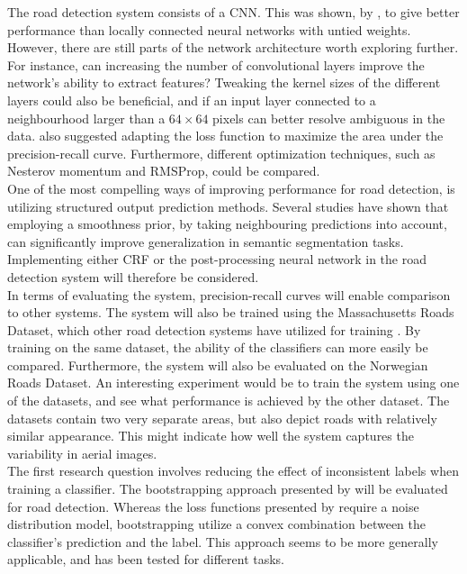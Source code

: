 The road detection system consists of a \ac{CNN}. This was shown, by \cite{MnihThesis}, to give better performance than locally connected neural networks with untied weights. However, there are still parts of the network architecture worth exploring further. For instance, can increasing the number of convolutional layers improve the network's ability to extract features? Tweaking the kernel sizes of the different layers could also be beneficial, and if an input layer connected to a neighbourhood larger than a $64 \times 64$ pixels can better resolve ambiguous in the data. \cite{MnihThesis} also suggested adapting the loss function to maximize the area under the precision-recall curve. Furthermore, different optimization techniques, such as Nesterov momentum and RMSProp, could be compared.\\

One of the most compelling ways of improving performance for road detection, is utilizing structured output prediction methods. Several studies \citep{Kluckner_semantic_height} \citep{LeCun_semantic} \citep{Mnih_roads_high_res_aerial_images} have shown that employing a smoothness prior, by taking neighbouring predictions into account, can significantly improve generalization in semantic segmentation tasks. Implementing either \ac{CRF} or the post-processing neural network in the road detection system will therefore be considered.\\

In terms of evaluating the system, precision-recall curves will enable comparison to other systems. The system will also be trained using the Massachusetts Roads Dataset, which other road detection systems have utilized for training \citep{MnihThesis}\citep{saito_building_and_roads}. By training on the same dataset, the ability of the classifiers can more easily be compared. Furthermore, the system will also be evaluated on the Norwegian Roads Dataset. An interesting experiment would be to train the system using one of the datasets, and see what performance is achieved by the other dataset. The datasets contain two very separate areas, but also depict roads with relatively similar appearance. This might indicate how well the system captures the variability in aerial images. \\

The first research question involves reducing the effect of inconsistent labels when training a classifier. The bootstrapping approach presented by \cite{Reed_noisy_labels_bootstrapping} will be evaluated for road detection. Whereas the loss functions presented by \citep{Mnih_aerial_images_noisy} require a noise distribution model,  bootstrapping utilize a   convex combination between the classifier's prediction and the label. This approach seems to be more generally applicable, and has been tested for different tasks.\\

